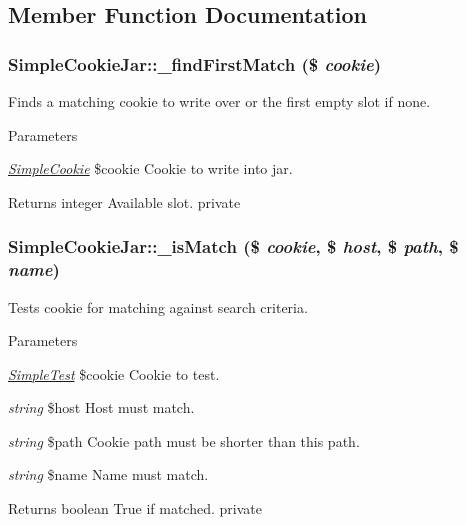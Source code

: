 \subsection{Member Function Documentation}
\hypertarget{class_simple_cookie_jar_ae6446b13958595cbd1ab43dff09ff0f2}{
\subsubsection[{\_\-findFirstMatch}]{\setlength{\rightskip}{0pt plus 5cm}SimpleCookieJar::\_\-findFirstMatch (\$ {\em cookie})}}
\label{class_simple_cookie_jar_ae6446b13958595cbd1ab43dff09ff0f2}
Finds a matching cookie to write over or the first empty slot if none. 
\begin{DoxyParams}{Parameters}
\item[{\em \hyperlink{class_simple_cookie}{SimpleCookie}}]\$cookie Cookie to write into jar. \end{DoxyParams}
\begin{DoxyReturn}{Returns}
integer Available slot.  private 
\end{DoxyReturn}
\hypertarget{class_simple_cookie_jar_ac14534e705b8c5cad177c11a9fc732a1}{
\subsubsection[{\_\-isMatch}]{\setlength{\rightskip}{0pt plus 5cm}SimpleCookieJar::\_\-isMatch (\$ {\em cookie}, \/  \$ {\em host}, \/  \$ {\em path}, \/  \$ {\em name})}}
\label{class_simple_cookie_jar_ac14534e705b8c5cad177c11a9fc732a1}
Tests cookie for matching against search criteria. 
\begin{DoxyParams}{Parameters}
\item[{\em \hyperlink{class_simple_test}{SimpleTest}}]\$cookie Cookie to test. \item[{\em string}]\$host Host must match. \item[{\em string}]\$path Cookie path must be shorter than this path. \item[{\em string}]\$name Name must match. \end{DoxyParams}
\begin{DoxyReturn}{Returns}
boolean True if matched.  private 
\end{DoxyReturn}
